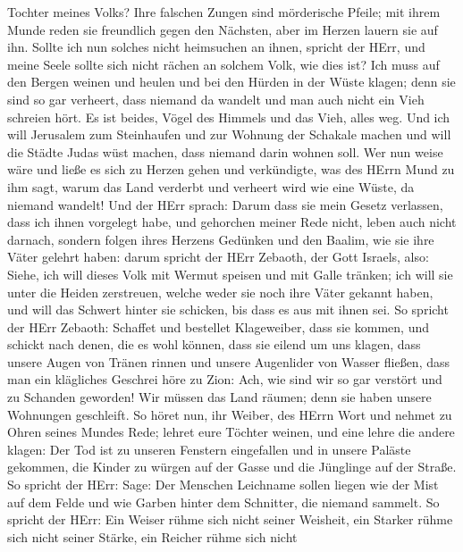 Tochter meines Volks?  Ihre falschen Zungen sind mörderische
Pfeile; mit ihrem Munde reden sie freundlich gegen den Nächsten, aber im
Herzen lauern sie auf ihn.  Sollte ich nun solches nicht
heimsuchen an ihnen, spricht der HErr, und meine Seele sollte sich nicht
rächen an solchem Volk, wie dies ist?  Ich muss auf den
Bergen weinen und heulen und bei den Hürden in der Wüste klagen; denn
sie sind so gar verheert, dass niemand da wandelt und man auch nicht ein
Vieh schreien hört. Es ist beides, Vögel des Himmels und das Vieh, alles
weg.  Und ich will Jerusalem zum Steinhaufen und zur
Wohnung der Schakale machen und will die Städte Judas wüst machen, dass
niemand darin wohnen soll.  Wer nun weise wäre und ließe es
sich zu Herzen gehen und verkündigte, was des HErrn Mund zu ihm sagt,
warum das Land verderbt und verheert wird wie eine Wüste, da niemand
wandelt!  Und der HErr sprach: Darum dass sie mein Gesetz
verlassen, dass ich ihnen vorgelegt habe, und gehorchen meiner Rede
nicht, leben auch nicht darnach,  sondern folgen ihres
Herzens Gedünken und den Baalim, wie sie ihre Väter gelehrt haben:
 darum spricht der HErr Zebaoth, der Gott Israels, also:
Siehe, ich will dieses Volk mit Wermut speisen und mit Galle tränken;
 ich will sie unter die Heiden zerstreuen, welche weder sie
noch ihre Väter gekannt haben, und will das Schwert hinter sie schicken,
bis dass es aus mit ihnen sei.  So spricht der HErr
Zebaoth: Schaffet und bestellet Klageweiber, dass sie kommen, und
schickt nach denen, die es wohl können,  dass sie eilend um
uns klagen, dass unsere Augen von Tränen rinnen und unsere Augenlider
von Wasser fließen,  dass man ein klägliches Geschrei höre
zu Zion: Ach, wie sind wir so gar verstört und zu Schanden geworden! Wir
müssen das Land räumen; denn sie haben unsere Wohnungen geschleift.
 So höret nun, ihr Weiber, des HErrn Wort und nehmet zu
Ohren seines Mundes Rede; lehret eure Töchter weinen, und eine lehre die
andere klagen:  Der Tod ist zu unseren Fenstern eingefallen
und in unsere Paläste gekommen, die Kinder zu würgen auf der Gasse und
die Jünglinge auf der Straße.  So spricht der HErr: Sage:
Der Menschen Leichname sollen liegen wie der Mist auf dem Felde und wie
Garben hinter dem Schnitter, die niemand sammelt.  So
spricht der HErr: Ein Weiser rühme sich nicht seiner Weisheit, ein
Starker rühme sich nicht seiner Stärke, ein Reicher rühme sich nicht
